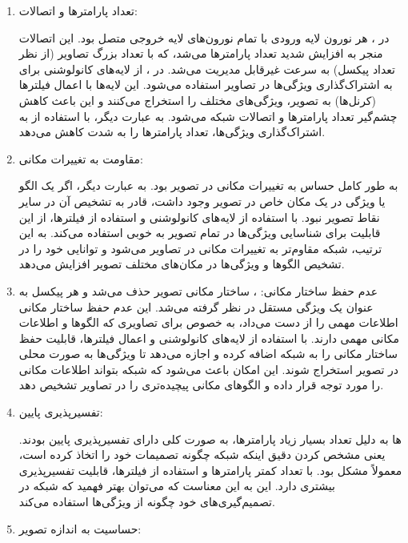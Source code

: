 \documentclass{article}
\begin{document}
\begin{enumerate}

\item تعداد پارامترها و اتصالات:

در ، هر نورون لایه ورودی با تمام نورون‌های لایه خروجی متصل بود. این اتصالات منجر به افزایش شدید تعداد پارامترها می‌شد، که با تعداد بزرگ تصاویر (از نظر تعداد پیکسل) به سرعت غیرقابل مدیریت می‌شد.
    در ، از لایه‌های کانولوشنی برای به اشتراک‌گذاری ویژگی‌ها در تصاویر استفاده می‌شود. این لایه‌ها با اعمال فیلترها (کرنل‌ها) به تصویر، ویژگی‌های مختلف را استخراج می‌کنند و این باعث کاهش چشم‌گیر تعداد پارامترها و اتصالات شبکه می‌شود. به عبارت دیگر،  با استفاده از به اشتراک‌گذاری ویژگی‌ها، تعداد پارامترها را به شدت کاهش می‌دهد.

\item مقاومت به تغییرات مکانی:

 به طور کامل حساس به تغییرات مکانی در تصویر بود. به عبارت دیگر، اگر یک الگو یا ویژگی در یک مکان خاص در تصویر وجود داشت،  قادر به تشخیص آن در سایر نقاط تصویر نبود.  با استفاده از لایه‌های کانولوشنی و استفاده از فیلترها، از این قابلیت برای شناسایی ویژگی‌ها در تمام تصویر به خوبی استفاده می‌کند. به این ترتیب، شبکه  مقاوم‌تر به تغییرات مکانی در تصاویر می‌شود و توانایی خود را در تشخیص الگوها و ویژگی‌ها در مکان‌های مختلف تصویر افزایش می‌دهد.

\item عدم حفظ ساختار مکانی:
، ساختار مکانی تصویر حذف می‌شد و هر پیکسل به عنوان یک ویژگی مستقل در نظر گرفته می‌شد. این عدم حفظ ساختار مکانی اطلاعات مهمی را از دست می‌داد، به خصوص برای تصاویری که الگوها و اطلاعات مکانی مهمی دارند.
     با استفاده از لایه‌های کانولوشنی و اعمال فیلترها، قابلیت حفظ ساختار مکانی را به شبکه اضافه کرده و اجازه می‌دهد تا ویژگی‌ها به صورت محلی در تصویر استخراج شوند. این امکان باعث می‌شود که شبکه بتواند اطلاعات مکانی را مورد توجه قرار داده و الگوهای مکانی پیچیده‌تری را در تصاویر تشخیص دهد.

\item تفسیرپذیری پایین:

    ‌ها به دلیل تعداد بسیار زیاد پارامترها، به صورت کلی دارای تفسیرپذیری پایین بودند. یعنی مشخص کردن دقیق اینکه شبکه چگونه تصمیمات خود را اتخاذ کرده است، معمولاً مشکل بود.
     با تعداد کمتر پارامترها و استفاده از فیلترها، قابلیت تفسیرپذیری بیشتری دارد. این به این معناست که می‌توان بهتر فهمید که شبکه در تصمیم‌گیری‌های خود چگونه از ویژگی‌ها استفاده می‌کند.

\item حساسیت به اندازه تصویر:


\end{enumerate}
\end{document}
